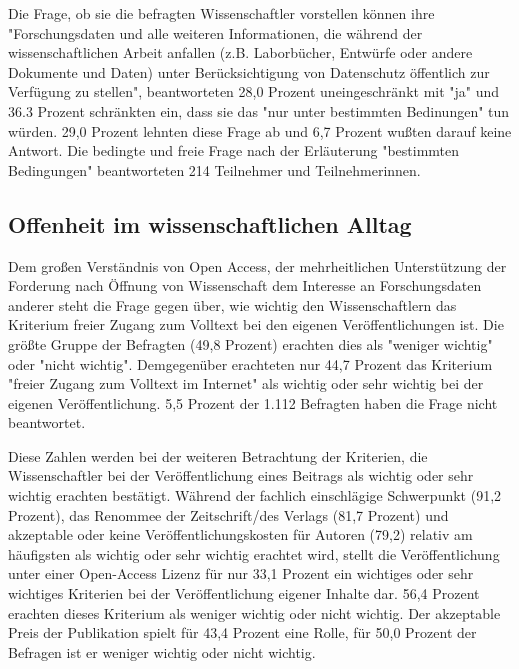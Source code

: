 Die Frage, ob sie die befragten Wissenschaftler vorstellen können ihre "Forschungsdaten und alle weiteren Informationen, die während der wissenschaftlichen Arbeit anfallen (z.B. Laborbücher, Entwürfe oder andere Dokumente und Daten) unter Berücksichtigung von Datenschutz öffentlich zur Verfügung zu stellen", beantworteten 28,0 Prozent uneingeschränkt mit "ja" und 36.3 Prozent schränkten ein, dass sie das "nur unter bestimmten Bedinungen" tun würden. 29,0 Prozent lehnten diese Frage ab und 6,7 Prozent wußten darauf keine Antwort. Die bedingte und freie Frage nach der Erläuterung "bestimmten Bedingungen" beantworteten 214 Teilnehmer und Teilnehmerinnen.

\subsection{Offenheit im wissenschaftlichen Alltag}

Dem großen Verständnis von Open Access, der mehrheitlichen Unterstützung der Forderung nach Öffnung von Wissenschaft dem Interesse an Forschungsdaten anderer steht die Frage gegen über, wie wichtig den Wissenschaftlern das Kriterium freier Zugang zum Volltext bei den eigenen Veröffentlichungen ist. Die größte Gruppe der Befragten (49,8 Prozent) erachten dies als "weniger wichtig" oder "nicht wichtig". Demgegenüber erachteten nur 44,7 Prozent das Kriterium "freier Zugang zum Volltext im Internet" als wichtig oder sehr wichtig bei der eigenen Veröffentlichung. 5,5 Prozent der 1.112 Befragten haben die Frage nicht beantwortet.

Diese Zahlen werden bei der weiteren Betrachtung der Kriterien, die Wissenschaftler bei der Veröffentlichung eines Beitrags als wichtig oder sehr wichtig erachten bestätigt. Während der fachlich einschlägige Schwerpunkt (91,2 Prozent), das Renommee der Zeitschrift/des Verlags (81,7 Prozent) und akzeptable oder keine Veröffentlichungskosten für Autoren (79,2) relativ am häufigsten als wichtig oder sehr wichtig erachtet wird, stellt die Veröffentlichung unter einer Open-Access Lizenz für nur 33,1 Prozent ein wichtiges oder sehr wichtiges Kriterien bei der Veröffentlichung eigener Inhalte dar. 56,4 Prozent erachten dieses Kriterium als weniger wichtig oder nicht wichtig. Der akzeptable Preis der Publikation spielt für 43,4 Prozent eine Rolle, für 50,0 Prozent der Befragen ist er weniger wichtig oder nicht wichtig.

